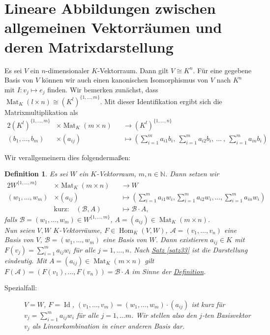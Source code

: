 \documentclass{report}
\newcommand{\N}{\mathbb{N}}
\newcommand{\baseb}{\mathcal{B}}
\newcommand{\basea}{\mathcal{A}}
\DeclareMathOperator{\Hom}{Hom}
\DeclareMathOperator{\Mat}{Mat}
\DeclareMathOperator{\Id}{Id}
\theoremstyle{customrem}
\theoremstyle{customdef}
\newtheorem{definition}{Definition}[chapter]
\theoremstyle{customenv}
\begin{document}
\section{Lineare Abbildungen zwischen allgemeinen Vektorräumen und deren Matrixdarstellung}

Es sei \(V\) ein \(n\)-dimensionaler \(K\)-Vektorraum. Dann gilt \(V\cong K^n\). Für eine gegebene Basis von \(V\) können wir auch einen kanonischen Isomorphismus von \(V\) nach \(K^n\) mit \(I:v_j\mapsto e_j\) finden. Wir bemerken zunächst, dass \(\Mat_K(l\times n)\cong \left(K^l\right)^{\{1, \ldots, m\}}\). Mit dieser Identifikation ergibt sich die Matrixmultiplikation als
\begin{alignat*}{2}
	\left(K^l\right)^{\{1, \ldots, m\}} &\times \Mat_K(m\times n) &&\to \left(K^l\right)^{\{1, \ldots, n\}}\\
							  (b_1, \ldots, b_m) &\times (a_{ij}) &&\mapsto \left(\sum_{i=1}^{m}a_{i1}b_i,\ \sum_{i=1}^{m}a_{i2}b_i,\ \ldots\ , \ \sum_{i=1}^{m}a_{in}b_i\right)
\end{alignat*}

Wir verallgemeinern dies folgendermaßen:
	
	\begin{definition}
		\label{def45}
		Es sei \(W\) ein \(K\)-Vektorraum, \(m,n\in\N\). Dann setzen wir
		\begin{alignat*}{2}
			W^{\{1,\ldots, m\}} &\times \Mat_K(m\times n) &&\to W\\
			(w_1,\ldots, w_m) &\times (a_{ij}) &&\mapsto \left(\sum_{i=1}^{m}a_{i1}w_i, \sum_{i=1}^{m}a_{i2}w_i, \ldots, \sum_{i=1}^{m}a_{in}w_i\right)\\
			&\text{kurz:}\quad (\baseb, A) &&\mapsto \baseb\cdot A,
		\end{alignat*}
		falls \(\baseb=(w_1,\ldots, w_m)\in W^{\{1, \ldots, m\}}\), \(A=(a_{ij})\in\Mat_K(m\times n)\).\\
		
		Nun seien \(V,W\) \(K\)-Vektorräume, \(F\in\Hom_K(V,W)\), \(\basea = (v_1,\ldots, v_n)\) eine Basis von \(V\), \(\baseb=(w_1, \ldots, w_m)\) eine Basis von \(W\). Dann existieren \(a_{ij} \in K\) mit \(F(v_j) = \sum_{i=1}^{m}a_{ij}w_i\) für alle \(j=1,\ldots, n\). Nach \hyperref[satz33]{Satz \ref*{satz33}} ist die Darstellung eindeutig. Mit \(A=(a_{ij})\in\Mat_K(m\times n)\) gilt \(F(\basea) = (F(v_1), \ldots, F(v_n))=\baseb\cdot A\) im Sinne der \hyperref[def45]{Definition}. 
		\begin{description}
			\item[Spezialfall:] \(V=W\), \(F=\Id\), \((v_1, \ldots, v_m) =(w_1, \ldots, w_m)\cdot(a_{ij})\) ist kurz für \(v_j = \sum_{i=1}^{m}a_{ij}w_i\) für alle \(j=1,\ldots m\). Wir stellen also den \(j\)-ten Basisvektor \(v_j\) als Linearkombination in einer anderen Basis dar.
		\end{description}
	\end{definition}
	
\end{document}
